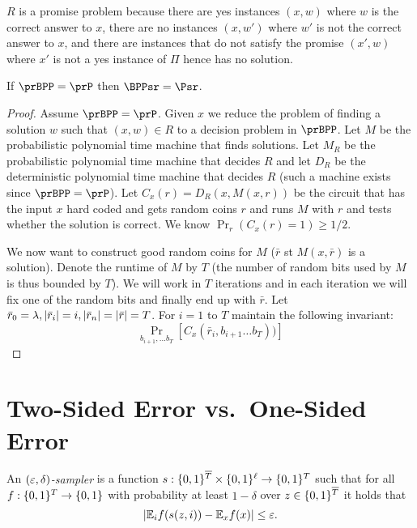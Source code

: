$R$ is a promise problem because there are yes instances $(x,w)$ where $w$ is the correct answer to $x$, there are no instances $(x,w')$ where $w'$ is not the correct answer to $x$, and there are instances that do not satisfy the promise $(x',w)$ where $x'$ is not a yes instance of $\Pi$ hence has no solution.

\begin{theorem}
	If $\prBPP = \prP$ then $\BPPsr = \Psr$.
\end{theorem}
\begin{proof}
	Assume $\prBPP=\prP$. Given $x$ we reduce the problem of finding a solution $w$ such that $(x,w) \in R$ to a decision problem in $\prBPP$. Let $M$ be the probabilistic polynomial time machine that finds solutions. Let $M_R$ be the probabilistic polynomial time machine that decides $R$ and let $D_R$ be the deterministic polynomial time machine that decides $R$ (such a machine exists since $\prBPP=\prP$). 
	Let $C_x(r)= D_R(x, M(x,r))$ be the circuit that has the input $x$ hard coded and gets random coins $r$ and runs $M$ with $r$ and tests whether the solution is correct. We know $\Pr_r(C_x(r)=1) \geq 1/2$.
	
	We now want to construct good random coins for $M$ ($\bar{r}$ st $M(x,\bar{r})$ is a solution). Denote the runtime of $M$ by $T$ (the number of random bits used by $M$ is thus bounded by $T$). We will work in $T$ iterations and in each iteration we will fix one of the random bits and finally end up with $\bar{r}$. Let $\bar{r}_0 = \lambda, \lvert\bar{r}_i\rvert=i, \lvert\bar{r}_n\rvert = \lvert\bar{r}\rvert = T$.
	For $i=1$ to $T$ maintain the following invariant:
	\[
		\Pr_{b_{i+1},\ldots b_T}[C_x(\bar{r}_i, b_{i+1} \ldots b_T))]
	\]
	
	
\end{proof}

\section{Two-Sided Error vs.\ One-Sided Error}


\begin{definition}\label{def:sampler}
  An \emph{$(\varepsilon, \delta)$-sampler} is a function $s :
  \{0,1\}^{\overline{T}} \times \{0,1\}^\ell \to \{0,1\}^T$ such that for
  all $f : \{0,1\}^T \to \{0,1\}$ with probability at least $1 - \delta$ 
  over $z \in \{0,1\}^{\overline{T}}$ it holds that \[
    |\mathbb{E}_i f(s(z, i)) - \mathbb{E}_x f(x)| \le \varepsilon.
  \]
\end{definition}

